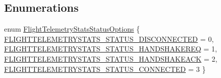 \subsection*{\-Enumerations}
\begin{DoxyCompactItemize}
\item 
enum \hyperlink{group___flight_telemetry_stats_ga9a944a33e155bc01195a9b045d09ddeb}{\-Flight\-Telemetry\-Stats\-Status\-Options} \{ \hyperlink{group___flight_telemetry_stats_gga9a944a33e155bc01195a9b045d09ddeba93e94e6f9bd7fa7adaa9e3f8f2305999}{\-F\-L\-I\-G\-H\-T\-T\-E\-L\-E\-M\-E\-T\-R\-Y\-S\-T\-A\-T\-S\-\_\-\-S\-T\-A\-T\-U\-S\-\_\-\-D\-I\-S\-C\-O\-N\-N\-E\-C\-T\-E\-D} = 0, 
\hyperlink{group___flight_telemetry_stats_gga9a944a33e155bc01195a9b045d09ddebae716883b40d53017d25e5ecb3c33e9da}{\-F\-L\-I\-G\-H\-T\-T\-E\-L\-E\-M\-E\-T\-R\-Y\-S\-T\-A\-T\-S\-\_\-\-S\-T\-A\-T\-U\-S\-\_\-\-H\-A\-N\-D\-S\-H\-A\-K\-E\-R\-E\-Q} = 1, 
\hyperlink{group___flight_telemetry_stats_gga9a944a33e155bc01195a9b045d09ddeba112356cf41b486e17aaa153126831b26}{\-F\-L\-I\-G\-H\-T\-T\-E\-L\-E\-M\-E\-T\-R\-Y\-S\-T\-A\-T\-S\-\_\-\-S\-T\-A\-T\-U\-S\-\_\-\-H\-A\-N\-D\-S\-H\-A\-K\-E\-A\-C\-K} = 2, 
\hyperlink{group___flight_telemetry_stats_gga9a944a33e155bc01195a9b045d09ddeba5fa1e197a568d9fdc125852c325f734a}{\-F\-L\-I\-G\-H\-T\-T\-E\-L\-E\-M\-E\-T\-R\-Y\-S\-T\-A\-T\-S\-\_\-\-S\-T\-A\-T\-U\-S\-\_\-\-C\-O\-N\-N\-E\-C\-T\-E\-D} = 3
 \}
\end{DoxyCompactItemize}
